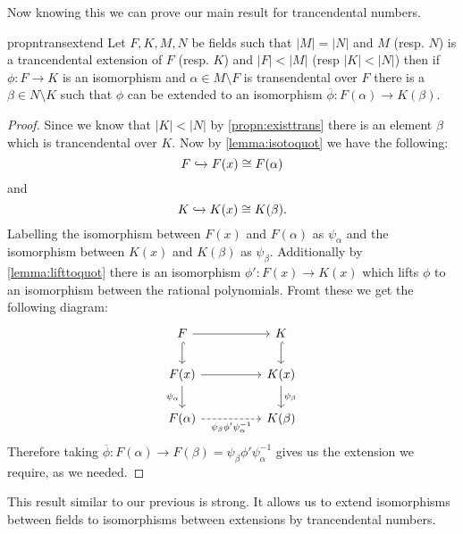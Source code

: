 Now knowing this we can prove our main result for trancendental numbers.

\begin{restatable}{propn}{transextend}
  Let $F, K, M, N$ be fields such that $|M| = |N|$ and  
  $M$ (resp. $N$) is a trancendental extension of $F$ (resp. $K$) 
  and $|F| < |M|$ (resp $|K| < |N|$) then if $\phi: F \to K$ is an isomorphism
  and $\alpha \in M\setminus F$ is transendental over $F$ there is a $\beta \in
  N \setminus K$ such that $\phi$ can be extended to an isomorphism
  $\overline{\phi}: F(\alpha) \to K(\beta)$.
\end{restatable}
\begin{proof}
  Since we know that $|K| < |N|$ by \cref{propn:existtrans} there is an
  element $\beta$ which is trancendental over $K$. Now by
  \cref{lemma:isotoquot} we have the following:
  \[
    F \xhookrightarrow{} F(x) \cong F(\alpha)
  \] 
  and
  \[
    K \xhookrightarrow{} K(x) \cong K(\beta)
  .\] 
  Labelling the isomorphism between $F(x)$ and $F(\alpha)$ as $\psi_{\alpha}$ 
  and the isomorphism between $K(x)$ and $K(\beta)$ as $\psi_{\beta}$.
  Additionally by \cref{lemma:lifttoquot} there is an isomorphism $\phi':
  F(x) \to K(x)$ which lifts $\phi$ to an isomorphism between the rational
  polynomials. Fromt these we get the following diagram:
  \begin{equation}
  \begin{tikzcd}
    F  \arrow[rr] \arrow[d, hook] & & K \arrow[d, hook] \\
    F(x) \arrow[rr] \arrow[d, "\psi_{\alpha}"']& & K(x) 
                                        \arrow[d, "\psi_{\beta}"]
    \\
    F(\alpha) \arrow[rr, dashed, "\psi_{\beta}\phi'\psi_{\alpha}^{-1}"'] 
                                              & & K(\beta)
  \end{tikzcd}
  \end{equation}
  Therefore taking $\overline{\phi}: F(\alpha) \to F(\beta)
  = \psi_{\beta}\phi'\psi_{\alpha}^{-1}$ gives us the extension we require, as
  we needed.
\end{proof}

This result similar to our previous is strong. It allows us to extend
isomorphisms between fields to isomorphisms between extensions by trancendental
numbers. 
